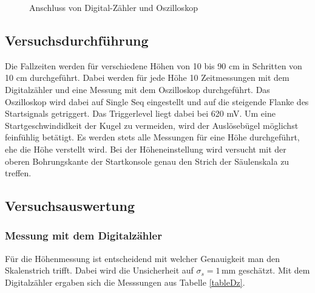\documentclass[a4paper, 12pt]{scrartcl}
\begin{document}
\begin{figure}[h]
	\centering
	\caption{Anschluss von Digital-Zähler und Oszilloskop}
	\label{AnschlussOsDz}
\end{figure}



\subsection{Versuchsdurchführung}

Die Fallzeiten werden für verschiedene Höhen von 10 bis 90 cm in Schritten von 10 cm durchgeführt. Dabei werden für jede Höhe 10 Zeitmessungen mit dem Digitalzähler und eine Messung mit dem Oszilloskop durchgeführt. Das Oszilloskop wird dabei auf Single Seq eingestellt und auf die steigende Flanke des Startsignals getriggert. Das Triggerlevel liegt dabei bei 620 mV. Um eine Startgeschwindidkeit der Kugel zu vermeiden, wird der Auslösebügel möglichst feinfühlig betätigt. Es werden stets alle Messungen für eine Höhe durchgeführt, ehe die Höhe verstellt wird. Bei der Höheneinstellung wird versucht mit der oberen Bohrungskante der Startkonsole genau den Strich der Säulenskala zu treffen.


\subsection{Versuchsauswertung}

\subsubsection{Messung mit dem Digitalzähler}

Für die Höhenmessung ist entscheidend mit welcher Genauigkeit man den Skalenstrich trifft. Dabei wird die Unsicherheit auf $\sigma_s = 1 \, \mathrm{mm}$ geschätzt. Mit dem Digitalzähler ergaben sich die Messsungen aus Tabelle \ref{tableDz}.
\end{document}
